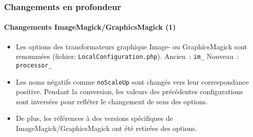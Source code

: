 \begin{frame}[fragile]
	\frametitle{Changements en profondeur}
	\framesubtitle{Changements ImageMagick/GraphicsMagick (1)}

	\lstset{basicstyle=\tiny\ttfamily}

	\begin{itemize}

		\item Les options des transformateurs graphique Image- ou GraphicsMagick sont renommées
			(fichier: \texttt{LocalConfiguration.php}).\newline
			Ancien~:\tabto{1.6cm} \texttt{im\_}\newline
			Nouveau~:\tabto{1.6cm} \texttt{processor\_}

		\item Les noms négatifs comme \texttt{noScaleUp} sont changés vers leur correspondance positive.
			Pendant la conversion, les valeurs des précédentes configurations sont inversées pour
			refléter le changement de sens des options.

		\item De plus, les références à des versions spécifiques de ImageMagick/GraphicsMagick ont
			été retirées des options.

	\end{itemize}

\end{frame}

